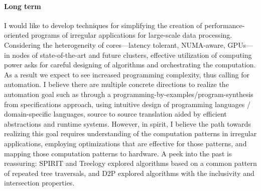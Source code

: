 \paragraph{Long term} I would like to develop techniques for simplifying the creation of performance-oriented programs of irregular applications for large-scale data processing. 
Considering the heterogeneity of cores---latency tolerant, NUMA-aware, GPUs---in nodes of state-of-the-art and future clusters, effective utilization of computing power asks for careful designing of algorithms and orchestrating the computation. 
As a result we expect to see increased programming complexity, thus calling for automation. 
I believe there are multiple concrete directions to realize the automation goal such as through a programming-by-examples/program-synthesis from specifications approach, using intuitive design of programming languages / domain-specific languages, source to source translation aided by efficient abstractions and runtime systems.
However, in spirit, I believe the path towards realizing this goal requires understanding of the computation patterns in irregular applications, employing optimizations that are effective for those patterns, and mapping those computation patterns to hardware.  
A peek into the past is reassuring: SPIRIT and Treelogy explored algorithms based on a common pattern of repeated tree traversals, and D2P explored algorithms with the inclusivity and intersection properties.%



